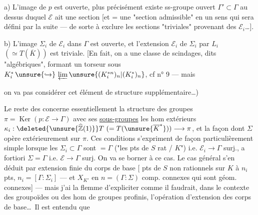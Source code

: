 a) L'image \inserted{\(\Sigma\)} de \(p\) est ouverte, plus précisément existe
ss-groupe ouvert \(\Gamma'\subset\Gamma\) au dessus duquel
\(\mathcal E\) ait une section [et = une "section admissible" en un sens qui sera
défini par la suite --- de sorte à exclure les sections "triviales" provenant
des \(\mathcal E_i\)\ldots].

b) L'image \(\Sigma_i\) de \(\mathcal E_i\) dans \(\Gamma\) est ouverte, et
l'extension \(\mathcal E_i\) de \(\Sigma_i\) par \(L_i\)
\((\simeq T(\overline K))\) est triviale. [En fait, on a une classe
 de scindages, dits "algébriques", formant un
torseur sous
\(K_i^*\,\unsure{\hookrightarrow}\,\varprojlim\unsure{(K_i^{*n})_n|(K_i^{*})_n}\),
cf n° 9 \unsure{]|?} --- mais



on va pas considérer  cet élément de structure
supplémentaire\ldots)


Le reste des  concerne
essentiellement la structure des groupes \(\pi=\operatorname{Ker}(p:\mathcal E\to\Gamma)\) avec
ses  \uline{sous-groupes}
 les hom extérieurs
\(\kappa_i:\deleted{\unsure{\widehat{\mathbb Z}(1)}}T\ (=T(\unsure{\overline K^*}))\longrightarrow\pi\),
et la façon dont \(\Sigma\) opère extérieurement sur \(\pi\).
Ces conditions s'expriment de façon particulièrement simple lorsque les
\(\Sigma_i\subset\Gamma\) sont \(=\Gamma\)
("les pts de \(S\)  rat / \(K\)") i.e.
\(\mathcal E_i\to\Gamma\) surj., a fortiori \(\Sigma=\Gamma\) i.e.
\(\mathcal E\to\Gamma\) surj. On va se borner à ce cas. Le cas général s'en déduit
par extension finie du corps de base
[  pts de
\(S\) non rationnels sur \(K\)
à \(n_i\) pts, 
\(n_i=[\Gamma:\Sigma_i]\) \unsure{\(\}\)} --- et \(X_{K'}\)
  en \(n=(\Gamma:\Sigma)\) comp. connexes
qui sont géom. connexes] --- mais j'ai la flemme d'expliciter comme il faudrait,
dans le contexte des groupoïdes ou des  hom de groupes
profinis, l'opération d'extension des corps de base\ldots\ Il est entendu que


